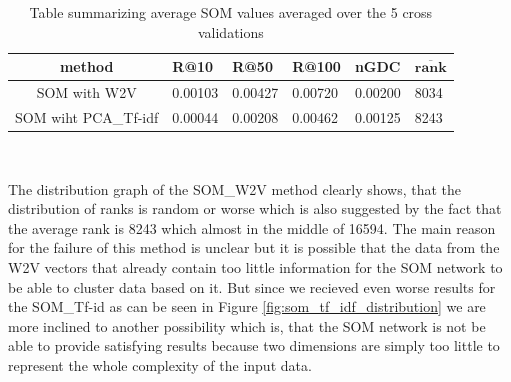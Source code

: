 \begin{table}[h]
\centering
\renewcommand{\arraystretch}{1.5}
\begin{tabu} to 1\textwidth { | c || X[c] | X[c] | X[c] | X[c] | X[c] |}
 \hline
 \textbf{method} & \textbf{R@10} & \textbf{R@50} & \textbf{R@100} & \textbf{nGDC} & $ \boldsymbol{\overline{rank}} $ \\
 \hline
 \hline
 SOM with W2V & 0.00103 & 0.00427 & 0.00720 & 0.00200 & 8034 \\
 \hline
 SOM wiht PCA\_Tf-idf & 0.00044 & 0.00208 & 0.00462 & 0.00125 & 8243 \\
 \hline
\end{tabu} \\
\caption{Table summarizing average SOM values averaged over the 5 cross validations}
\label{table:som}
\end{table}
The distribution graph of the SOM\_W2V method clearly shows, that the distribution of ranks is random or worse which is also suggested by the fact that the average rank is 8243 which almost in the middle of 16594. The main reason for the failure of this method is unclear but it is possible that the data from the W2V vectors that already contain too little information for the SOM network to be able to cluster data based on it.  But since we recieved even worse results for the SOM\_Tf-id as can be seen in Figure \ref{fig:som_tf_idf_distribution} we are more inclined to another possibility which is, that the SOM network is not be able to provide satisfying results because two dimensions are simply too little to represent the whole complexity of the input data.


